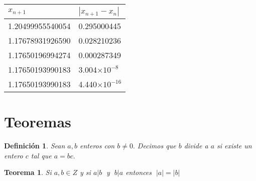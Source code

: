 \documentclass{article}
\newtheorem{unadefi}{Definición}[section] %
\newtheorem{unteo}{Teorema}[section] %
\begin{document}
\begin{tabular}{ll}
\rowcolor{LightBlue2} $x_{n+1}$ & $|x_{n+1}-x_n|$\\ \hline
\cellcolor[gray]{0.80} 1.20499955540054 & 0.295000445\\
1.17678931926590 & 0.028210236\\
1.17650196994274 & 0.000287349\\
1.17650193990183 & 3.004$\times10^{-8}$\\
\cellcolor[gray]{0.80} 1.17650193990183 & 4.440$\times10^{-16}$\\ \hline
\end{tabular}

\section{Teoremas}

\begin{unadefi}
Sean $a,b$ enteros con $b \not = 0.$ Decimos que $b$ divide a $a$
si existe un entero $c$ tal que $a=bc.$
\end{unadefi}

\begin{unteo}
Si $a,b \in Z$ y si $a|b\;$ y $\;b|a$ entonces $\;|a|=|b|$
\end{unteo}
\end{document}
